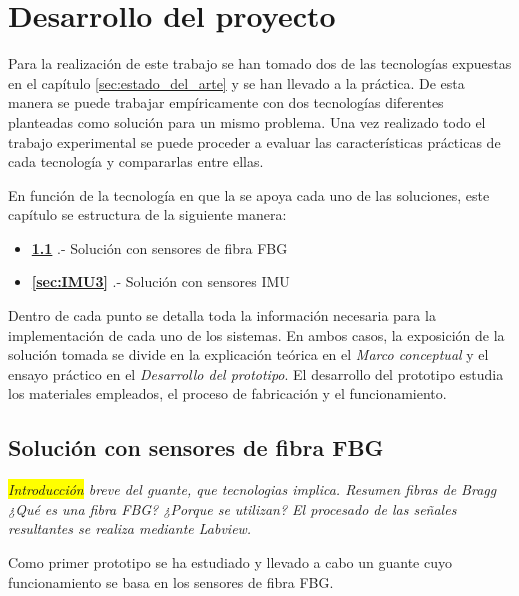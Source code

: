 \chapter{Desarrollo del proyecto\label{sec:disenho}}

Para la realización de este trabajo se han tomado dos de las tecnologías expuestas en el capítulo \ref{sec:estado_del_arte} y se han llevado a la práctica. De esta manera se puede trabajar empíricamente con dos tecnologías diferentes planteadas como solución para un mismo problema. Una vez realizado todo el trabajo experimental se puede proceder a evaluar las características prácticas de cada tecnología y compararlas entre ellas. 

En función de la tecnología en que la se apoya cada uno de las soluciones, %
este capítulo se estructura de la siguiente manera: 
\begin{itemize}
	\item {\textbf{\ref{sec:FBG3}}    .- Solución con sensores de fibra FBG} 
	\item {\textbf{\ref{sec:IMU3}}    .- Solución con sensores IMU}
\end{itemize}




Dentro de cada punto se detalla toda la información necesaria para la implementación de cada uno de los sistemas. En ambos casos, la exposición de la solución tomada se divide en la explicación teórica en el \textit{Marco conceptual} y el ensayo práctico en el \textit{Desarrollo del prototipo}. El desarrollo del prototipo estudia los materiales empleados, el proceso de fabricación y el funcionamiento.  

\section{Solución con sensores de fibra FBG}
\label{sec:FBG3}

\textcolor{rositaoscuro}{
	\textit{
		\colorbox{yellow}{Introducción} breve del guante, que tecnologias implica.
		Resumen fibras de Bragg 
		¿Qué es una fibra FBG?
		¿Porque se utilizan?
		El procesado de las señales resultantes se realiza mediante Labview.
	}
}


 Como primer prototipo se ha estudiado y llevado a cabo un guante cuyo funcionamiento se basa en los sensores de fibra FBG. 
 
